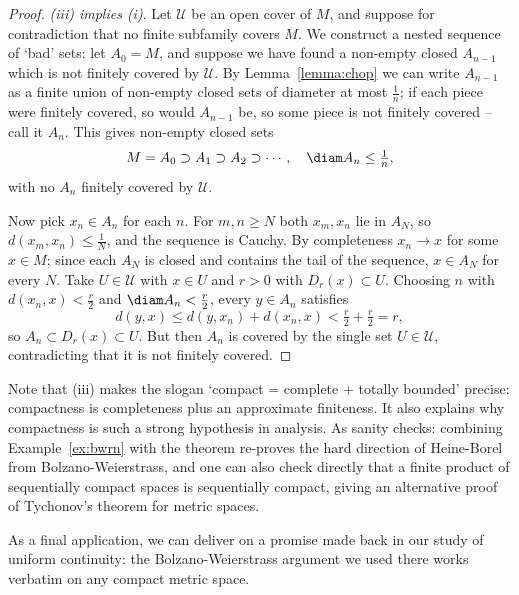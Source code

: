\begin{proof}
    \emph{(iii) implies (i)}. Let $\mathcal{U}$ be an open cover of $M$, and suppose for contradiction that no finite subfamily covers $M$. We construct a nested sequence of `bad' sets: let $A_0 = M$, and suppose we have found a non-empty closed $A_{n - 1}$ which is not finitely covered by $\mathcal{U}$. By Lemma~\ref{lemma:chop} we can write $A_{n - 1}$ as a finite union of non-empty closed sets of diameter at most $\frac{1}{n}$; if each piece were finitely covered, so would $A_{n-1}$ be, so some piece is not finitely covered -- call it $A_n$. This gives non-empty closed sets
    $$
    M = A_0 \supset A_1 \supset A_2 \supset \cdots, \quad \diam A_n \leq \tfrac{1}{n},
    $$
    with no $A_n$ finitely covered by $\mathcal{U}$.

    Now pick $x_n \in A_n$ for each $n$. For $m, n \geq N$ both $x_m, x_n$ lie in $A_N$, so $d(x_m, x_n) \leq \frac{1}{N}$, and the sequence is Cauchy. By completeness $x_n \rightarrow x$ for some $x \in M$; since each $A_N$ is closed and contains the tail of the sequence, $x \in A_N$ for every $N$. Take $U \in \mathcal{U}$ with $x \in U$ and $r > 0$ with $D_r(x) \subset U$. Choosing $n$ with $d(x_n, x) < \frac{r}{2}$ and $\diam A_n < \frac{r}{2}$, every $y \in A_n$ satisfies
    $$
    d(y, x) \leq d(y, x_n) + d(x_n, x) < \tfrac{r}{2} + \tfrac{r}{2} = r,
    $$
    so $A_n \subset D_r(x) \subset U$. But then $A_n$ is covered by the single set $U \in \mathcal{U}$, contradicting that it is not finitely covered.
\end{proof}

\begin{remark}
    Note that (iii) makes the slogan `compact = complete + totally bounded' precise: compactness is completeness plus an approximate finiteness. It also explains why compactness is such a strong hypothesis in analysis. As sanity checks: combining Example~\ref{ex:bwrn} with the theorem re-proves the hard direction of Heine-Borel from Bolzano-Weierstrass, and one can also check directly that a finite product of sequentially compact spaces is sequentially compact, giving an alternative proof of Tychonov's theorem for metric spaces.
\end{remark}

As a final application, we can deliver on a promise made back in our study of uniform continuity: the Bolzano-Weierstrass argument we used there works verbatim on any compact metric space.

